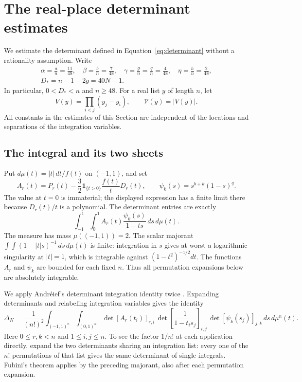 \section{The real-place determinant estimates}\label{sec:real-place}

We estimate the determinant defined in Equation~\eqref{eq:determinant}
without a rationality assumption.  Write
\begin{equation}\label{eq:real-normalized-parameters}
 \begin{gathered}
 \alpha=\frac an=\frac{11}{48},\quad
 \beta=\frac bn=\frac7{48},\quad
 \gamma=\frac gn=\frac qn=\frac4{48},\quad
 \eta=\frac hn=\frac2{48},\\
 D_*=n-1-2g=40N-1.
 \end{gathered}
\end{equation}
In particular, $0<D_*<n$ and $n\ge48$.  For a real list $y$ of
length $n$, let
\[
 V(y)=\prod_{i<j}(y_j-y_i),\qquad \mathcal V(y)=|V(y)|.
\]
All constants in the estimates of this Section are independent of the
locations and separations of the integration variables.

\subsection{The integral and its two sheets}

Put $d\mu(t)=|t|\,dt/f(t)$ on $(-1,1)$, and set
\[
 A_r(t)=P_r(t)-\frac32\boldsymbol 1_{\{t>0\}}\frac{f(t)}tD_r(t),
 \qquad \psi_k(s)=s^{b+k}(1-s)^q.
\]
The value at $t=0$ is immaterial; the displayed expression has a finite
limit there because $D_r(t)/t$ is a polynomial.  The determinant entries
are exactly
\[
 \int_{-1}^1\int_0^1 A_r(t)\frac{\psi_k(s)}{1-ts}\,ds\,d\mu(t).
\]
The measure has mass $\mu((-1,1))=2$.  The scalar majorant
$\int\!\int(1-|t|s)^{-1}\,ds\,d\mu(t)$ is finite: integration in $s$
gives at worst a logarithmic singularity at $|t|=1$, which is integrable
against $(1-t^2)^{-1/2}dt$.  The functions $A_r$ and $\psi_k$ are
bounded for each fixed $n$.  Thus all permutation expansions below are
absolutely integrable.

We apply Andr\'eief's determinant integration identity twice
\cite[Equation~(1.7) and Section~2.2]{Forrester2018Andreief}.
Expanding determinants and relabeling integration variables gives
the identity
\begin{equation}\label{eq:real-double-integral}
 \Delta_N=\frac1{(n!)^2}\int_{(-1,1)^n}\int_{(0,1)^n}
 \det[A_r(t_i)]_{r,i}\,
 \det\left[\frac1{1-t_i s_j}\right]_{i,j}\,
 \det[\psi_k(s_j)]_{j,k}\,ds\,d\mu^n(t).
\end{equation}
Here $0\le r,k<n$ and $1\le i,j\le n$.  To see the factor $1/n!$
at each application directly, expand the two determinants sharing an
integration list: every one of the $n!$ permutations of that list gives
the same determinant of single integrals.  Fubini's theorem applies by
the preceding majorant, also after each permutation expansion.

